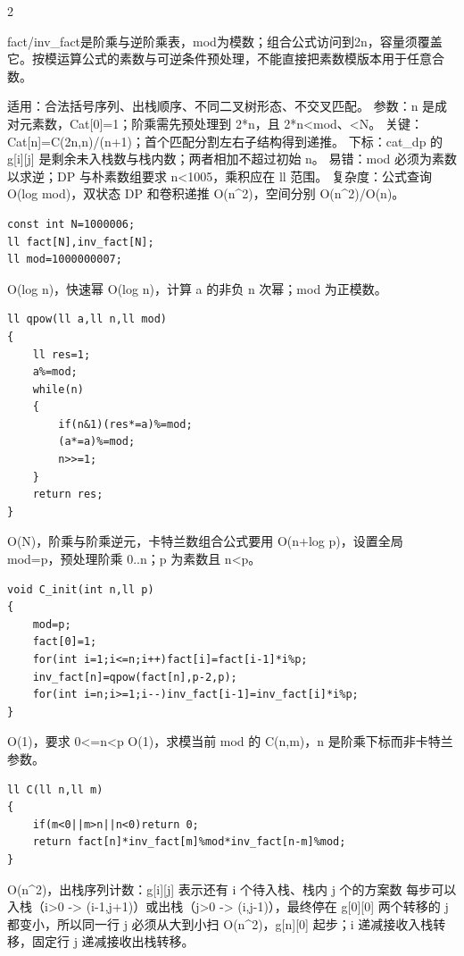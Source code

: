 \documentclass[UTF8,fontset=fandol,a4paper,twoside]{ctexart}
\newcommand{\note}[1]{{\fontsize{10}{12}\selectfont #1\par}}
\begin{document}
\begin{multicols}{2}
\note{fact/\allowbreak{}inv\_fact是阶乘与逆阶乘表，mod为模数；组合公式访问到2n，容量须覆盖它。按模运算公式的素数与可逆条件预处理，不能直接把素数模版本用于任意合数。}
\note{适用：合法括号序列、出栈顺序、不同二叉树形态、不交叉匹配。 参数：n 是成对元素数，Cat[\allowbreak{}0]\allowbreak{}=\allowbreak{}1；阶乘需先预处理到 2*n，且 2*n<\allowbreak{}mod、<\allowbreak{}N。 关键：Cat[\allowbreak{}n]\allowbreak{}=\allowbreak{}C(\allowbreak{}2n,\allowbreak{}n)\allowbreak{}/\allowbreak{}(\allowbreak{}n+\allowbreak{}1)\allowbreak{}；首个匹配分割左右子结构得到递推。 下标：cat\_dp 的 g[\allowbreak{}i]\allowbreak{}[\allowbreak{}j]\allowbreak{} 是剩余未入栈数与栈内数；两者相加不超过初始 n。 易错：mod 必须为素数以求逆；DP 与朴素数组要求 n<\allowbreak{}1005，乘积应在 ll 范围。 复杂度：公式查询 O(\allowbreak{}log mod)\allowbreak{}，双状态 DP 和卷积递推 O(\allowbreak{}n\textasciicircum{}2)\allowbreak{}，空间分别 O(\allowbreak{}n\textasciicircum{}2)\allowbreak{}/\allowbreak{}O(\allowbreak{}n)\allowbreak{}。}
\begin{lstlisting}
const int N=1000006;
ll fact[N],inv_fact[N];
ll mod=1000000007;
\end{lstlisting}
\note{O(\allowbreak{}log n)\allowbreak{}，快速幂 O(\allowbreak{}log n)\allowbreak{}，计算 a 的非负 n 次幂；mod 为正模数。}
\begin{lstlisting}
ll qpow(ll a,ll n,ll mod)
{
    ll res=1;
    a%=mod;
    while(n)
    {
        if(n&1)(res*=a)%=mod;
        (a*=a)%=mod;
        n>>=1;
    }
    return res;
}
\end{lstlisting}
\note{O(\allowbreak{}N)\allowbreak{}，阶乘与阶乘逆元，卡特兰数组合公式要用 O(\allowbreak{}n+\allowbreak{}log p)\allowbreak{}，设置全局 mod=\allowbreak{}p，预处理阶乘 0.\allowbreak{}.\allowbreak{}n；p 为素数且 n<\allowbreak{}p。}
\begin{lstlisting}
void C_init(int n,ll p)
{
    mod=p;
    fact[0]=1;
    for(int i=1;i<=n;i++)fact[i]=fact[i-1]*i%p;
    inv_fact[n]=qpow(fact[n],p-2,p);
    for(int i=n;i>=1;i--)inv_fact[i-1]=inv_fact[i]*i%p;
}
\end{lstlisting}
\note{O(\allowbreak{}1)\allowbreak{}，要求 0<\allowbreak{}=\allowbreak{}n<\allowbreak{}p O(\allowbreak{}1)\allowbreak{}，求模当前 mod 的 C(\allowbreak{}n,\allowbreak{}m)\allowbreak{}，n 是阶乘下标而非卡特兰参数。}
\begin{lstlisting}
ll C(ll n,ll m)
{
    if(m<0||m>n||n<0)return 0;
    return fact[n]*inv_fact[m]%mod*inv_fact[n-m]%mod;
}
\end{lstlisting}
\note{O(\allowbreak{}n\textasciicircum{}2)\allowbreak{}，出栈序列计数：g[\allowbreak{}i]\allowbreak{}[\allowbreak{}j]\allowbreak{} 表示还有 i 个待入栈、栈内 j 个的方案数 每步可以入栈（i>\allowbreak{}0 -\allowbreak{}>\allowbreak{} (\allowbreak{}i-\allowbreak{}1,\allowbreak{}j+\allowbreak{}1)\allowbreak{}）或出栈（j>\allowbreak{}0 -\allowbreak{}>\allowbreak{} (\allowbreak{}i,\allowbreak{}j-\allowbreak{}1)\allowbreak{}），最终停在 g[\allowbreak{}0]\allowbreak{}[\allowbreak{}0]\allowbreak{} 两个转移的 j 都变小，所以同一行 j 必须从大到小扫 O(\allowbreak{}n\textasciicircum{}2)\allowbreak{}，g[\allowbreak{}n]\allowbreak{}[\allowbreak{}0]\allowbreak{} 起步；i 递减接收入栈转移，固定行 j 递减接收出栈转移。}

\end{multicols}
\end{document}

